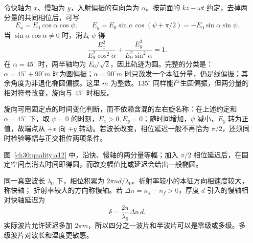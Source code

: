 \begin{xesolution}
\begin{center}\begin{minipage}{.96\linewidth}\centering
{}
\end{minipage}\end{center}

令快轴为 $x$、慢轴为 $y$，入射偏振的有向角为 $\alpha$。按前面的 $kz-\omega t$ 约定，去掉两分量的共同相位后，可写
\[
 E_x=E_0\cos\alpha\cos\psi,\qquad
 E_y=E_0\sin\alpha\cos(\psi+\pi/2)=-E_0\sin\alpha\sin\psi.
\]
当 $\sin\alpha\cos\alpha\ne0$ 时，消去 $\psi$ 得
\[
 \frac{E_x^2}{E_0^2\cos^2\alpha}
 +\frac{E_y^2}{E_0^2\sin^2\alpha}=1.
\]
在 $\alpha=45^\circ$ 时，两半轴均为 $E_0/\sqrt2$，因此轨迹为圆。完整的分类是：
$\alpha=45^\circ+90^\circ m$ 时为圆偏振；$\alpha=90^\circ m$ 时只激发一个本征分量，仍是线偏振；其余角度为非退化椭圆偏振。这里 $m$ 为整数。$135^\circ$ 同样能产生圆偏振，但两分量的相对符号改变，旋向与 $45^\circ$ 时相反。

旋向可用固定点的时间变化判断，而不依赖含混的左右旋名称：在上述约定和 $\alpha=45^\circ$ 下，取 $\psi=0$ 的时刻，$E_x>0,E_y=0$；随时间增加，$\psi$ 减小，$E_y$ 转为正值，故端点从 $+x$ 向 $+y$ 转动。若波长改变，相位延迟一般不再恰为 $\pi/2$，还须同时检验等幅与正交相位两项条件。

图~\ref{ch30:quality:a12} 中，沿快、慢轴的两分量等幅；加入 $\pi/2$ 相位延迟后，在固定空间点消去时间即得圆，而改变幅值比或延迟会给出一般椭圆。
\end{xesolution}



同一真空波长 $\lambda_0$ 下，相位积累为 $2\pi nd/\lambda_0$。折射率较小的本征方向相速度较大，称快轴；
折射率较大的方向称慢轴。若 $\Delta n=n_s-n_f>0$，厚度 $d$ 引入的慢轴相对快轴延迟为
\begin{equation}
 \delta=\frac{2\pi}{\lambda_0}\Delta n\,d.
\end{equation}
实际波片允许延迟多加 $2\pi m$，所以四分之一波片和半波片可以是零级或多级。多级波片对波长和温度更敏感。

